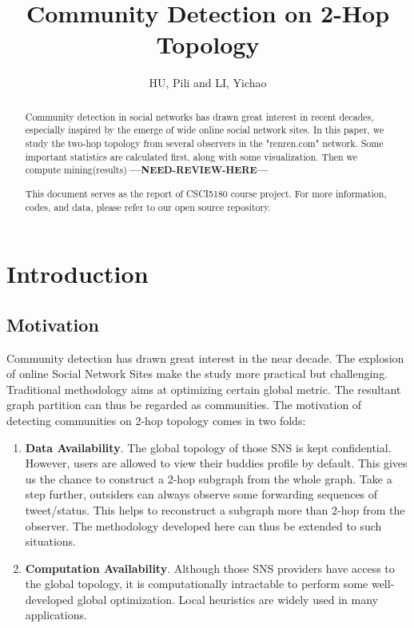 \documentclass[11pt,a4paper]{article}
\author{HU, Pili and LI, Yichao}
\title{Community Detection on 2-Hop Topology}
\newcommand{\question}{\textbf{---NEED-REVIEW-HERE---}}
\begin{document}
\maketitle

\begin{abstract}
	Community detection in social networks has drawn great interest
	in recent decades, especially inspired by the emerge of wide 
	online social network sites. In this paper, we study the two-hop 
	topology from several observers in the "renren.com" network. 
	Some important statistics are calculated first, along with 
	some visualization. Then we compute mining(results)
	 \question

	This document serves as the report of CSCI5180 course 
	project\cite{csci5180_lecture,csci5180_tutorial}. 
	For more information, codes, and data, please refer to 
	our open source repository\cite{hu2011-cd2hop}. 
	
\end{abstract}

\pagebreak
\tableofcontents
\pagebreak

\section{Introduction}

\subsection{Motivation}

Community detection has drawn great interest in the near decade. 
The explosion of online Social Network Sites make the study more 
practical but challenging. Traditional methodology aims at 
optimizing certain global metric. The resultant graph partition 
can thus be regarded as communities. The motivation of detecting 
communities on 2-hop topology comes in two folds: 
\begin{enumerate}
	\item \textbf{Data Availability}. The global topology of 
	those SNS is kept confidential. However, users are allowed 
	to view their buddies profile by default. This gives us the 
	chance to construct a 2-hop subgraph from the whole graph. 
	Take a step further, outsiders can always observe some forwarding 
	sequences of tweet/status. This helps to reconstruct a 
	subgraph more than 2-hop from the observer. The methodology 
	developed here can thus be extended to such situations. 
	\item \textbf{Computation Availability}. Although those SNS 
	providers have access to the global topology, it is computationally
	intractable to perform some well-developed global optimization. 
	Local heuristics are widely used in many applications. 
\end{enumerate}
\end{document}
